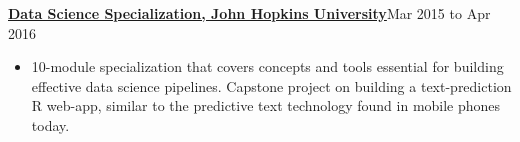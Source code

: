 \documentclass[10pt]{article}
\newenvironment{innerlist}[1][\enskip\textbullet]%
        {\begin{itemize}[#1,leftmargin=*,parsep=0pt,itemsep=0pt,topsep=0pt,partopsep=0pt]}
        {\end{itemize}}
\begin{document}
{\begin{minipage}[t]{\textwidth+\marginparwidth+\marginparsep}
        \vspace{.1in}
        {\bf \href{https://www.coursera.org/account/accomplishments/specialization/YP6NMPR4X3M9}{Data Science Specialization, John Hopkins University}}\hfill{Mar 2015 to Apr 2016}\\[-0.1in]
        \begin{innerlist}
            \item[] 10-module specialization that covers concepts and tools essential for
                building effective data science pipelines. Capstone project on building a
                text-prediction R web-app, similar to the predictive text technology found
                in mobile phones today.
        \end{innerlist}

    \end{minipage}
}\\[.15\baselineskip]

\newpage

\end{document}
